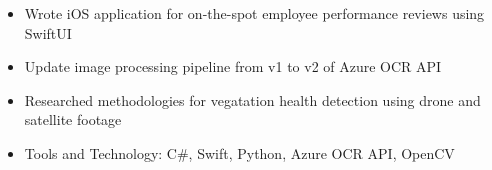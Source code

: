 \begin{itemize}
    \setlength\itemsep{0pt}
    \setlength{\parskip}{0pt}
    \item Wrote iOS application for on-the-spot employee performance reviews using SwiftUI
    \item Update image processing pipeline from v1 to v2 of Azure OCR API
    \item Researched methodologies for vegatation health detection using drone and satellite footage
    \item Tools and Technology: C\#, Swift, Python, Azure OCR API, OpenCV
\end{itemize}
